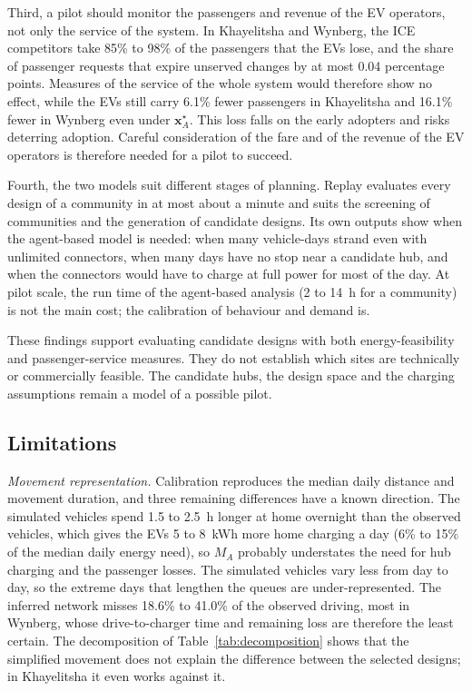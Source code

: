 \documentclass{elsarticle}
\newcommand{\MA}{\ensuremath{M_A}}
\newcommand{\xA}{\ensuremath{\mathbf{x}_A^{\star}}}
\begin{document}
Third, a pilot should monitor the passengers and revenue of the EV operators, not only the service of the system. In Khayelitsha and Wynberg, the ICE competitors take 85\% to 98\% of the passengers that the EVs lose, and the share of passenger requests that expire unserved changes by at most 0.04 percentage points. Measures of the service of the whole system would therefore show no effect, while the EVs still carry 6.1\% fewer passengers in Khayelitsha and 16.1\% fewer in Wynberg even under \xA. This loss falls on the early adopters and risks deterring adoption. Careful consideration of the fare and of the revenue of the EV operators is therefore needed for a pilot to succeed.

Fourth, the two models suit different stages of planning. Replay evaluates every design of a community in at most about a minute and suits the screening of communities and the generation of candidate designs. Its own outputs show when the agent-based model is needed: when many vehicle-days strand even with unlimited connectors, when many days have no stop near a candidate hub, and when the connectors would have to charge at full power for most of the day. At pilot scale, the run time of the agent-based analysis (2 to 14~h for a community) is not the main cost; the calibration of behaviour and demand is.

These findings support evaluating candidate designs with both energy-feasibility and passenger-service measures. They do not establish which sites are technically or commercially feasible. The candidate hubs, the design space and the charging assumptions remain a model of a possible pilot.

\subsection{Limitations}
\label{sec:discussion_limitations}

\emph{Movement representation.} Calibration reproduces the median daily distance and movement duration, and three remaining differences have a known direction. The simulated vehicles spend 1.5 to 2.5~h longer at home overnight than the observed vehicles, which gives the EVs 5 to 8~kWh more home charging a day (6\% to 15\% of the median daily energy need), so \MA{} probably understates the need for hub charging and the passenger losses. The simulated vehicles vary less from day to day, so the extreme days that lengthen the queues are under-represented. The inferred network misses 18.6\% to 41.0\% of the observed driving, most in Wynberg, whose drive-to-charger time and remaining loss are therefore the least certain. The decomposition of Table~\ref{tab:decomposition} shows that the simplified movement does not explain the difference between the selected designs; in Khayelitsha it even works against it.
\end{document}
